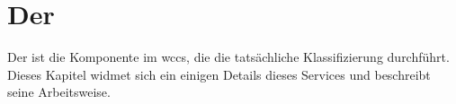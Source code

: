 \section{Der {\classificationService}}
    \label{section:solutionDetailsClassificationService}
    Der {\classificationService} ist die Komponente im \gls{wccs},
    die die tatsächliche Klassifizierung durchführt.
    Dieses Kapitel widmet sich ein einigen Details dieses Services
    und beschreibt seine Arbeitsweise.

    
    
    
    
